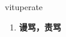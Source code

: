 
\begin{frame}
{\huge vituperate}
\begin{center}
\begin{enumerate}\Large
  \item \textbf{谩骂，责骂}
\end{enumerate}
\end{center}
\end{frame}
